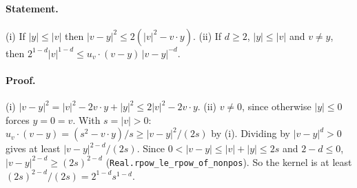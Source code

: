 \paragraph{Statement.} (i) If $|y|\le|v|$ then $|v-y|^2\le2(|v|^2-v\cdot y)$. (ii) If $d\ge2$,
$|y|\le|v|$ and $v\ne y$, then $2^{1-d}|v|^{1-d}\le u_v\cdot(v-y)\,|v-y|^{-d}$.
\paragraph{Proof.} (i) $|v-y|^2=|v|^2-2v\cdot y+|y|^2\le2|v|^2-2v\cdot y$. (ii) $v\ne0$, since
otherwise $|y|\le0$ forces $y=0=v$. With $s=|v|>0$: $u_v\cdot(v-y)=(s^2-v\cdot y)/s\ge|v-y|^2/(2s)$
by (i). Dividing by $|v-y|^d>0$ gives at least $|v-y|^{2-d}/(2s)$. Since $0<|v-y|\le|v|+|y|\le2s$
and $2-d\le0$, $|v-y|^{2-d}\ge(2s)^{2-d}$ (\texttt{Real.rpow\_le\_rpow\_of\_nonpos}). So the kernel
is at least $(2s)^{2-d}/(2s)=2^{1-d}s^{1-d}$.
